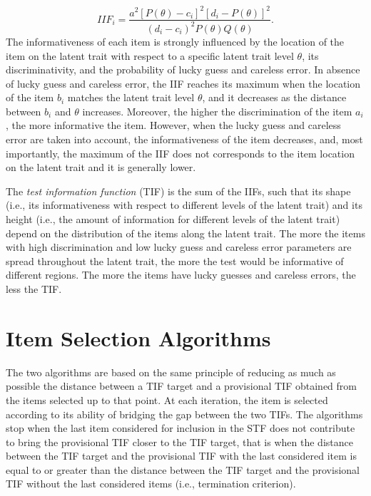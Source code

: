 \documentclass{svproc}
\begin{document}
\begin{equation}[eq:iif]
	IIF_i = \dfrac{a^2[P(\theta)-c_i]^2[d_i - P(\theta)]^2}{(d_i-c_i)^2 P(\theta)Q(\theta)}.
\end{equation}
The informativeness of each item is strongly influenced by the location of the item on the latent trait with respect to a specific latent trait level $\theta$, its discriminativity, and the probability of lucky guess and careless error. In absence of lucky guess and careless error, the IIF reaches its maximum when the location of the item $b_i$ matches the latent trait level $\theta$, and it decreases as the distance between $b_i$ and $\theta$ increases. Moreover, the higher the discrimination of the item $a_i$, the more informative the item. However, when the lucky guess and careless error are taken into account, the informativeness of the item decreases, and, most importantly, the maximum of the IIF does not corresponds to the item location on the latent trait and it is generally lower. 

The \emph{test information function} (TIF) is the sum of the IIFs, such that its shape (i.e., its informativeness with respect to different levels of the latent trait) and its height (i.e., the amount of information for different levels of the latent trait) depend on the distribution of the items along the latent trait. The more the items with high discrimination and low lucky guess and careless error parameters are spread throughout the latent trait, the more the test would be informative of different regions. The more the items have lucky guesses and careless errors, the less the TIF. 

\section{Item Selection Algorithms}

The two algorithms are based on the same principle of reducing as much as possible the distance between a TIF target and a provisional TIF obtained from the items selected up to that point. 
At each iteration, the item is selected according to its ability of bridging the gap between the two TIFs. The algorithms stop when the last item considered for inclusion in the STF does not contribute to bring the provisional TIF closer to the TIF target, that is when the distance between the TIF target and the provisional TIF with the last considered item is equal to or greater than the distance between the TIF target and the provisional TIF without the last considered items (i.e., termination criterion). 
\end{document}
